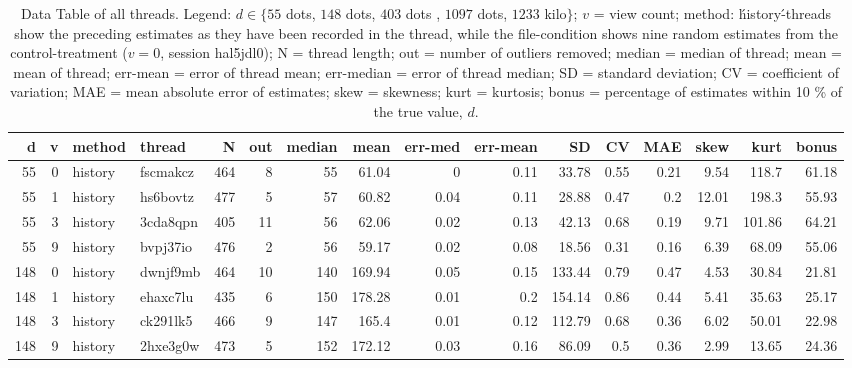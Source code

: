 \documentclass[9pt,twoside,lineno]{pnas-new}
\begin{document}
\begin{table}\centering
\caption{Data Table of all threads. Legend: $d \in \{55$ dots, $148$ dots, $403$ dots , $1097$ dots, $1233$ kilo$\}$; $v$ = view count; method: \'history\'-threads show the preceding estimates as they have been recorded in the thread, while the file-condition shows nine random estimates from the control-treatment ($v=0$, session hal5jdl0); N = thread length; out = number of outliers removed; median = median of thread; mean = mean of thread; err-mean = error of thread mean; err-median = error of thread median; SD = standard deviation; CV = coefficient of variation; MAE = mean absolute error of estimates; skew = skewness; kurt = kurtosis; bonus = percentage of estimates within 10 \% of the true value, $d$.}
\begin{tabular}{rrllrrrrrrrrrrrr}
\hline
    d &   v & method   & thread   &   N &   out &   median &    mean &   err-med &   err-mean &      SD &   CV &   MAE &   skew &   kurt &   bonus \\
\hline
   55 &   0 & history  & fscmakcz & 464 &     8 &    55    &   61.04 &      0    &       0.11 &   33.78 & 0.55 &  0.21 &   9.54 & 118.7  &       61.18 \\
   55 &   1 & history  & hs6bovtz & 477 &     5 &    57    &   60.82 &      0.04 &       0.11 &   28.88 & 0.47 &  0.2  &  12.01 & 198.3  &       55.93 \\
   55 &   3 & history  & 3cda8qpn & 405 &    11 &    56    &   62.06 &      0.02 &       0.13 &   42.13 & 0.68 &  0.19 &   9.71 & 101.86 &       64.21 \\
   55 &   9 & history  & bvpj37io & 476 &     2 &    56    &   59.17 &      0.02 &       0.08 &   18.56 & 0.31 &  0.16 &   6.39 &  68.09 &       55.06 \\
  148 &   0 & history  & dwnjf9mb & 464 &    10 &   140    &  169.94 &      0.05 &       0.15 &  133.44 & 0.79 &  0.47 &   4.53 &  30.84 &       21.81 \\
  148 &   1 & history  & ehaxc7lu & 435 &     6 &   150    &  178.28 &      0.01 &       0.2  &  154.14 & 0.86 &  0.44 &   5.41 &  35.63 &       25.17 \\
  148 &   3 & history  & ck291lk5 & 466 &     9 &   147    &  165.4  &      0.01 &       0.12 &  112.79 & 0.68 &  0.36 &   6.02 &  50.01 &       22.98 \\
  148 &   9 & history  & 2hxe3g0w & 473 &     5 &   152    &  172.12 &      0.03 &       0.16 &   86.09 & 0.5  &  0.36 &   2.99 &  13.65 &       24.36 \\

\end{tabular}
\end{table}
\end{document}
